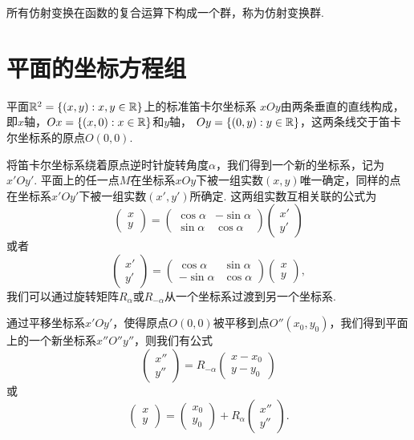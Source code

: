 所有仿射变换在函数的复合运算下构成一个群，称为{\kaishu 仿射变换群}. 

\section{平面的坐标方程组}
平面$\mathbb R^2=\{(x,y):x,y\in\mathbb R\}$上的标准{\kaishu 笛卡尔坐标系} $xOy$由两条垂直的直线构成，即$x$轴，$Ox=\{(x,0):x\in\mathbb R\}$和$y$轴，
$Oy=\{(0,y):y\in\mathbb R\}$，这两条线交于笛卡尔坐标系的原点$O(0,0)$.

将笛卡尔坐标系绕着原点逆时针旋转角度$\alpha$，我们得到一个新的坐标系，记为$x'Oy'$. 平面上的任一点$M$在坐标系$xOy$下被一组实数$(x,y)$唯一确定，同样的点在坐标系$x'Oy'$下被一组实数$(x',y')$所确定. 这两组实数互相关联的公式为
\[
  \begin{pmatrix}
    x \\
    y
  \end{pmatrix} =
  \begin{pmatrix}
    \cos\alpha & -\sin\alpha \\
    \sin\alpha & \cos\alpha
  \end{pmatrix}  \begin{pmatrix}
    x' \\
    y'
  \end{pmatrix}
\]
或者
\[
  \begin{pmatrix}
    x' \\
    y'
  \end{pmatrix} = \begin{pmatrix}
    \cos\alpha & \sin\alpha \\
    -\sin\alpha & \cos\alpha
  \end{pmatrix}
  \begin{pmatrix}
    x \\
    y
  \end{pmatrix},
\]
我们可以通过旋转矩阵$R_\alpha$或$R_{-\alpha}$从一个坐标系过渡到另一个坐标系.

通过平移坐标系$x'Oy'$，使得原点$O(0,0)$被平移到点$O''(x_0,y_0)$，我们得到平面上的一个新坐标系$x''O''y''$，则我们有公式
\[
  \begin{pmatrix}
    x'' \\
    y''
  \end{pmatrix} = R_{-\alpha} \begin{pmatrix}
    x - x_0 \\
    y - y_0
  \end{pmatrix}
\]
或
\[
  \begin{pmatrix}
    x \\
    y
  \end{pmatrix} =
  \begin{pmatrix}
    x_0 \\
    y_0
  \end{pmatrix} + R_\alpha
  \begin{pmatrix}
    x'' \\
    y''
  \end{pmatrix}.
\]

